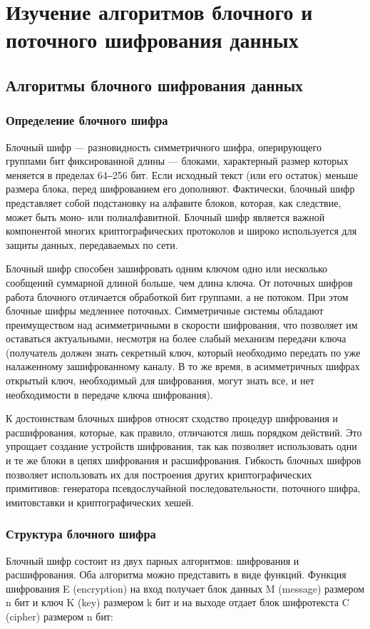 \documentclass[a4paper]{report}
\begin{document}
\chapter{Изучение алгоритмов блочного и поточного шифрования данных}
\section{Алгоритмы блочного шифрования данных}
\subsection{Определение блочного шифра}
Блочный шифр — разновидность симметричного шифра, оперирующего группами бит фиксированной длины — блоками, характерный размер которых меняется в пределах 64‒256 бит. Если исходный текст (или его остаток) меньше размера блока, перед шифрованием его дополняют. Фактически, блочный шифр представляет собой подстановку на алфавите блоков, которая, как следствие, может быть моно- или полиалфавитной. Блочный шифр является важной компонентой многих криптографических протоколов и широко используется для защиты данных, передаваемых по сети.

Блочный шифр способен зашифровать одним ключом одно или несколько сообщений суммарной длиной больше, чем длина ключа. От поточных шифров работа блочного отличается обработкой бит группами, а не потоком. При этом блочные шифры медленнее поточных. Симметричные системы обладают преимуществом над асимметричными в скорости шифрования, что позволяет им оставаться актуальными, несмотря на более слабый механизм передачи ключа (получатель должен знать секретный ключ, который необходимо передать по уже налаженному зашифрованному каналу. В то же время, в асимметричных шифрах открытый ключ, необходимый для шифрования, могут знать все, и нет необходимости в передаче ключа шифрования).

К достоинствам блочных шифров относят сходство процедур шифрования и расшифрования, которые, как правило, отличаются лишь порядком действий. Это упрощает создание устройств шифрования, так как позволяет использовать одни и те же блоки в цепях шифрования и расшифрования. 
\newpage Гибкость блочных шифров позволяет использовать их для построения других криптографических примитивов: генератора псевдослучайной последовательности, поточного шифра, имитовставки и криптографических хешей.

\subsection{Структура блочного шифра}
Блочный шифр состоит из двух парных алгоритмов: шифрования и расшифрования. Оба алгоритма можно представить в виде функций. Функция шифрования E (encryption) на вход получает блок данных M (message) размером n бит и ключ K (key) размером k бит и на выходе отдает блок шифротекста C (cipher) размером n бит:
\end{document}
